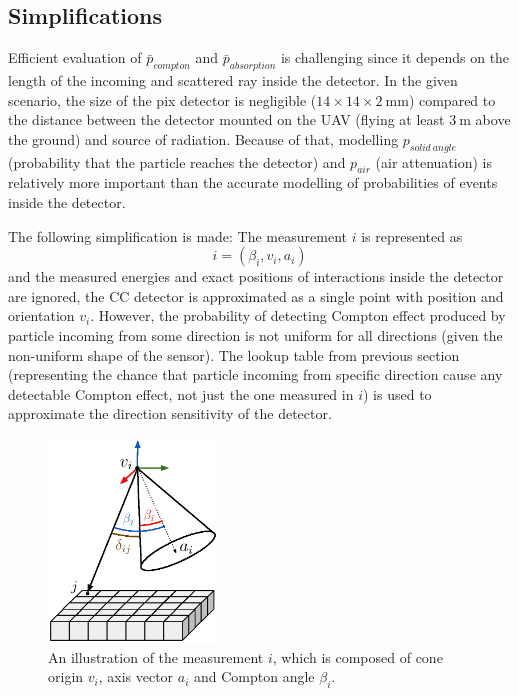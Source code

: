 \subsection{Simplifications}
Efficient evaluation of $\bar{p}_{compton}$ and $\bar{p}_{absorption}$ is challenging since it depends on the length of the incoming and scattered ray inside the detector.
In the given scenario, the size of the \ac{pix} detector is negligible ($14 \times 14 \times 2 \ \mathrm{mm}$) compared to the distance between the detector mounted on the \ac{UAV} (flying at least $\SI{3}\meter$ above the ground) and source of radiation.
Because of that, modelling $p_{solid\ angle}$ (probability that the particle reaches the detector) and $p_{air}$ (air attenuation) is relatively more important than the accurate modelling of probabilities of events inside the detector.

The following simplification is made:
The measurement $i$ is represented as
\begin{equation}
  i = (\beta_{i}, v_{i}, a_{i})
\end{equation}
and the measured energies and exact positions of interactions inside the detector are ignored,
the \ac{CC} detector is approximated as a single point with position and orientation $v_{i}$.
However, the probability of detecting Compton effect produced by particle incoming from some direction is not uniform for all directions (given the non-uniform shape of the sensor).
The lookup table from previous section (representing the chance that particle incoming from specific direction cause any detectable Compton effect, not just the one measured in $i$) is used to approximate the direction sensitivity of the detector.
\begin{figure}[!h]
  \centering
    \includegraphics[width=0.4\textwidth]{./fig/photos/system_comp.eps}
    \caption{An illustration of the measurement $i$, which is composed of cone origin $v_{i}$, axis vector $a_{i}$ and Compton angle $\beta_{i}$.}
    \label{fig:system_comp}
\end{figure}

